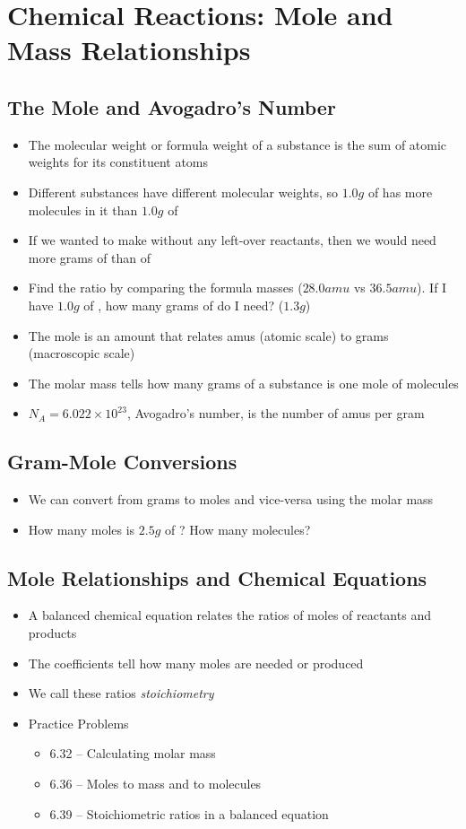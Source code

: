 \documentclass[12pt, openany, letterpaper]{memoir}
\begin{document}
\chapter{Chemical Reactions: Mole and Mass Relationships}
\section{The Mole and Avogadro's Number}
\begin{itemize}
	\item The molecular weight or formula weight of a substance is the sum of atomic weights for its constituent atoms
	\item Different substances have different molecular weights, so $1.0g$ of  has more molecules in it than $1.0g$ of 
	\item If we wanted to make  without any left-over reactants, then we would need more grams of  than of 
	\item Find the ratio by comparing the formula masses ($28.0amu$ vs $36.5amu$). If I have $1.0g$ of , how many grams of  do I need? ($1.3g$)
	\item The mole is an amount that relates amus (atomic scale) to grams (macroscopic scale)
	\item The molar mass tells how many grams of a substance is one mole of molecules
	\item $N_A=6.022\times10^{23}$, Avogadro's number, is the number of amus per gram
\end{itemize}
\section{Gram-Mole Conversions}
\begin{itemize}
	\item We can convert from grams to moles and vice-versa using the molar mass
	\item How many moles is $2.5g$ of ? How many molecules?
\end{itemize}

\section{Mole Relationships and Chemical Equations}
\begin{itemize}
	\item A balanced chemical equation relates the ratios of moles of reactants and products
	\item The coefficients tell how many moles are needed or produced
	\item We call these ratios \emph{stoichiometry}
	\item Practice Problems
	\begin{itemize}	
		\item 6.32 -- Calculating molar mass
		\item 6.36 -- Moles to mass and to molecules
		\item 6.39 -- Stoichiometric ratios in a balanced equation
	\end{itemize} 
\end{itemize}
\end{document}
